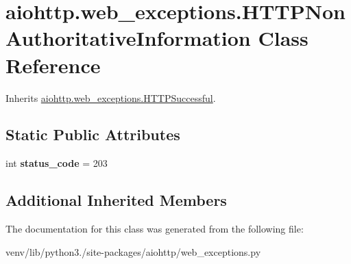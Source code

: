 \hypertarget{classaiohttp_1_1web__exceptions_1_1_h_t_t_p_non_authoritative_information}{}\section{aiohttp.\+web\+\_\+exceptions.\+H\+T\+T\+P\+Non\+Authoritative\+Information Class Reference}
\label{classaiohttp_1_1web__exceptions_1_1_h_t_t_p_non_authoritative_information}


Inherits \hyperlink{classaiohttp_1_1web__exceptions_1_1_h_t_t_p_successful}{aiohttp.\+web\+\_\+exceptions.\+H\+T\+T\+P\+Successful}.

\subsection*{Static Public Attributes}
\begin{DoxyCompactItemize}
\item 
\mbox{\label{classaiohttp_1_1web__exceptions_1_1_h_t_t_p_non_authoritative_information_a6f02a1995c31137f878efb8a9af04218}} 
int {\bfseries status\+\_\+code} = 203
\end{DoxyCompactItemize}
\subsection*{Additional Inherited Members}


The documentation for this class was generated from the following file\+:\begin{DoxyCompactItemize}
\item 
venv/lib/python3./site-\/packages/aiohttp/web\+\_\+exceptions.\+py\end{DoxyCompactItemize}
